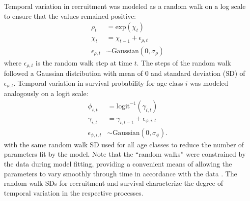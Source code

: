 \documentclass[11pt]{article}
\begin{document}
Temporal variation in recruitment was modeled as a random walk on a log scale to ensure
that the values remained positive:
%
\begin{equation} \label{eq:rho}
\begin{aligned}
\rho_t &= \text{exp}\left(\chi_t\right) \\
\chi_t &= \chi_{t-1} + \epsilon_{\rho,t} \\
\epsilon_{\rho,t} &\sim \text{Gaussian}\left(0, \sigma_{\rho} \right)
\end{aligned}
\end{equation}
%
where $\epsilon_{\rho,t}$ is the random walk step at time $t$.
The steps of the random walk followed a Gaussian distribution with mean of 0 
and standard deviation (SD) of $\epsilon_{\rho,t}$.
Temporal variation in survival probability for age class $i$ was modeled analogously 
on a logit scale:
%
\begin{equation} \label{eq:phi}
\begin{aligned}
\phi_{i, t} &= \text{logit}^{-1}\left(\gamma_{i, t}\right) \\
\gamma_{i, t} &= \gamma_{i, t - 1} + \epsilon_{\phi,i,t} \\
\epsilon_{\phi,i,t} &\sim \text{Gaussian}\left(0, \sigma_{\phi} \right)\text{.}
\end{aligned}
\end{equation}
%
with the same random walk SD used for all age classes 
to reduce the number of parameters fit by the model.
Note that the ``random walks'' were constrained by the data during model fitting,
providing a convenient means of allowing the parameters to vary smoothly through time
in accordance with the data
\citep{zeng1998, ives2012detecting}.
The random walk SDs for recruitment and survival 
characterize the degree of temporal variation in the respective processes. 
\end{document}
